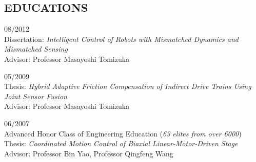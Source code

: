 \documentclass{res}
\begin{document}
\begin{resume}
\section{EDUCATIONS}
\vspace{0.1in}


       \hfill 08/2012\\
    Dissertation: {\it Intelligent Control of Robots with Mismatched Dynamics and Mismatched Sensing}\\
    Advisor: Professor Masayoshi Tomizuka

       \hfill 05/2009\\
    Thesis: {\it Hybrid Adaptive Friction Compensation of Indirect Drive Trains Using Joint Sensor Fusion}\\
    Advisor: Professor Masayoshi Tomizuka

       \hfill 06/2007\\
     \hfill Advanced Honor Class of Engineering Education (\emph{63 elites from over 6000})\\
    Thesis: {\it Coordinated Motion Control of Biaxial Linear-Motor-Driven Stage}\\
    Advisor: Professor Bin Yao, Professor Qingfeng Wang



\end{resume}
\end{document}
